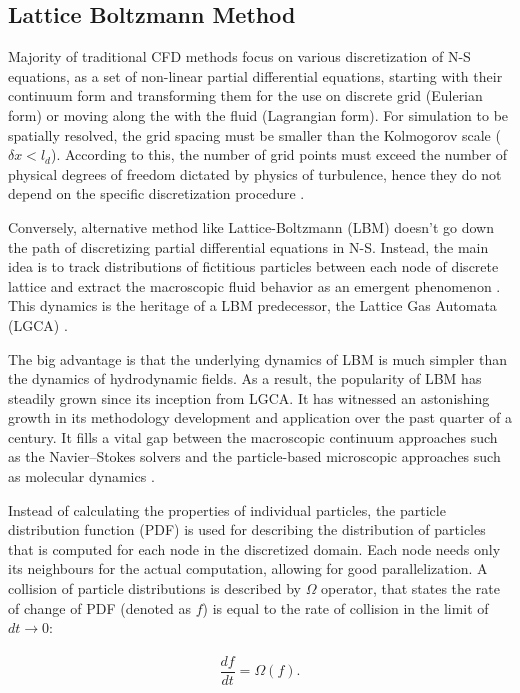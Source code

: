 \subsection{Lattice Boltzmann Method}
Majority of traditional CFD methods focus on various discretization of N-S equations, as a set of non-linear partial differential equations, starting with their continuum form and transforming them for the use on discrete grid (Eulerian form) or moving along the with the fluid (Lagrangian form). For simulation to be spatially resolved, the grid spacing must be smaller than the Kolmogorov scale ($\delta x < l_d$). According to this, the number of grid points must exceed the number of physical degrees of freedom dictated by physics of turbulence, hence they do not depend on the specific discretization procedure \citep{succi2018}.

Conversely, alternative method like Lattice-Boltzmann (LBM) doesn't go down the path of discretizing partial differential equations in N-S. Instead, the main idea is to track distributions of fictitious particles between each node of discrete lattice and extract the macroscopic fluid behavior as an emergent phenomenon \citep{succi2018}. This dynamics is the heritage of a LBM predecessor, the Lattice Gas Automata (LGCA) \citep{Hardy1973, frischLatticeGasAutomataNavierStokes1986}.

The big advantage is that the underlying dynamics of LBM is much simpler than the dynamics of hydrodynamic fields. As a result, the popularity of LBM has steadily grown since its inception from LGCA. It has witnessed an astonishing growth in its methodology development and application over the past quarter of a century. It fills a vital gap between the macroscopic continuum approaches such as the Navier–Stokes solvers and the particle-based microscopic approaches such as molecular dynamics \citep{liLatticeBoltzmannMethods2016a}.

Instead of calculating the properties of individual particles, the particle distribution function (PDF) is used for describing the distribution of particles that is computed for each node in the discretized domain. Each node needs only its neighbours for the actual computation, allowing for good parallelization. A collision of particle distributions is described by $\Omega$ operator, that states the rate of change of PDF (denoted as $f$) is equal to the rate of collision in the limit of $dt \xrightarrow[]{} 0$:

\begin{equation}
	\label{eq:collision-operator}
	\frac{df}{dt} = \Omega(f).
\end{equation}


